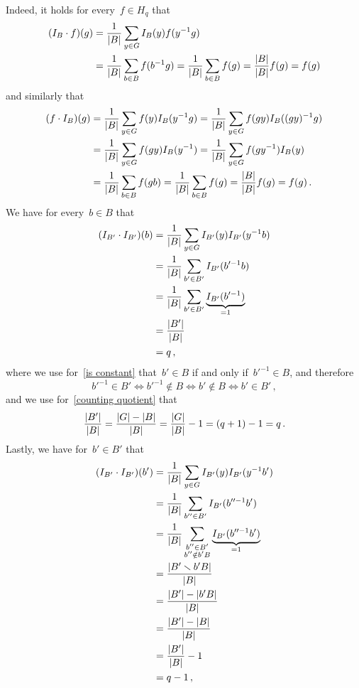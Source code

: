 Indeed, it holds for every~$f \in H_q$ that
\begin{align*}
      (I_B \cdot f)(g)
  &=  \frac{1}{\lvert B\rvert}
      \sum_{y \in G}
      I_B(y) f(y^{-1} g)  \\
  &=  \frac{1}{\lvert B\rvert}
      \sum_{b \in B}
      f(b^{-1} g)
   =  \frac{1}{\lvert B\rvert}
      \sum_{b \in B}
      f(g)
   =  \frac{\lvert B\rvert}{\lvert B\rvert} f(g)
   =  f(g)
\end{align*}
and similarly that
\begin{align*}
      (f \cdot I_B)(g)
  &=  \frac{1}{\lvert B\rvert}
      \sum_{y \in G}
      f(y) I_B(y^{-1} g)
   =  \frac{1}{\lvert B\rvert}
      \sum_{y \in G}
      f(gy) I_B((gy)^{-1} g)  \\
  &=  \frac{1}{\lvert B\rvert}
      \sum_{y \in G}
      f(gy) I_B(y^{-1})
   =  \frac{1}{\lvert B\rvert}
      \sum_{y \in G}
      f(gy^{-1}) I_B(y) \\
  &=  \frac{1}{\lvert B\rvert}
      \sum_{b \in B}
      f(gb)
   =  \frac{1}{\lvert B\rvert}
      \sum_{b \in B}
      f(g)
   =  \frac{\lvert B\rvert}{\lvert B\rvert} f(g)
   =  f(g) \,.
\end{align*}
We have for every~$b \in B$ that
\begin{align}
      (I_{B'} \cdot I_{B'})(b)
  &=  \frac{1}{\lvert B\rvert}
      \sum_{y \in G}
      I_{B'}(y) I_{B'}(y^{-1} b)  \notag  \\
  &=  \frac{1}{\lvert B\rvert}
      \sum_{b' \in B'}
      I_{B'}(b'^{-1} b) \notag  \\
  &=  \frac{1}{\lvert B\rvert}
      \sum_{b' \in B'}
      \underbrace{I_{B'}(b'^{-1})}_{=1} \notag  \\
  &=  \frac{\lvert B'\rvert}{\lvert B\rvert}  \label{is constant} \\
  &=  q \label{counting quotient} \,,
\end{align}
where we use for~\eqref{is constant} that~$b' \in B$ if and only if~$b'^{-1} \in B$, and therefore
\[
        b'^{-1} \in B'
  \iff  b'^{-1} \notin B
  \iff  b' \notin B
  \iff  b' \in B' \,,
\]
and we use for~\eqref{counting quotient} that
\[
    \frac{\lvert B'\rvert}{\lvert B\rvert}
  = \frac{\lvert G\rvert - \lvert B\rvert}{\lvert B\rvert}
  = \frac{\lvert G\rvert}{\lvert B\rvert} - 1
  = (q + 1) - 1
  = q \,.
\]
Lastly, we have for~$b' \in B'$ that
\begin{align}
      (I_{B'} \cdot I_{B'})(b')
  &=  \frac{1}{\lvert B\rvert}
      \sum_{y \in G}
      I_{B'}(y) I_{B'}(y^{-1} b') \notag  \\
  &=  \frac{1}{\lvert B\rvert}
      \sum_{b'' \in B'}
      I_{B'}(b''^{-1} b') \notag  \\
  &=  \frac{1}{\lvert B\rvert}
      \sum_{\substack{b'' \in B' \\ b'' \notin b' B}}
      \underbrace{I_{B'}(b''^{-1} b')}_{=1} \label{change sum}  \\
  &=  \frac{\lvert B' \smallsetminus b' B\rvert}{\lvert B\rvert}  \notag  \\
  &=  \frac{\lvert B'\rvert - \lvert b' B\rvert}{\lvert B\rvert} \label{difference}  \\
  &=  \frac{\lvert B'\rvert - \lvert B\rvert}{\lvert B\rvert} \notag  \\
  &=  \frac{\lvert B'\rvert}{\lvert B\rvert} - 1  \notag  \\
  &=  q - 1 \notag  \,,
\end{align}
